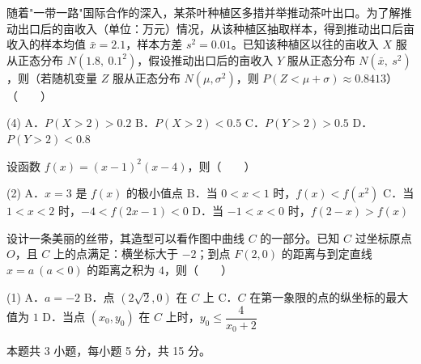 \begin{question}
随着"一带一路"国际合作的深入，某茶叶种植区多措并举推动茶叶出口。为了解推动出口后的亩收入（单位：万元）情况，从该种植区抽取样本，得到推动出口后亩收入的样本均值 $\bar x=2.1$，样本方差 $s^{2}=0.01$。已知该种植区以往的亩收入 $X$ 服从正态分布 $N\left(1.8,\ 0.1^{2}\right)$，假设推动出口后的亩收入 $Y$ 服从正态分布 $N\left(\bar x,\ s^{2}\right)$，则（若随机变量 $Z$ 服从正态分布 $N\left(\mu,\sigma^{2}\right)$，则 $P(Z<\mu+\sigma)\approx0.8413$）\mbox{（　　）}

\begin{gkopts}(4)
\task A．$P(X>2)>0.2$
\task B．$P(X>2)<0.5$
\task C．$P(Y>2)>0.5$
\task D．$P(Y>2)<0.8$
\end{gkopts}

\end{question}
\begin{question}
设函数 $f(x)=(x-1)^{2}(x-4)$，则\mbox{（　　）}

\begin{gkopts}(2)
\task A．$x=3$ 是 $f(x)$ 的极小值点
\task B．当 $0<x<1$ 时，$f(x)<f\left(x^{2}\right)$
\task C．当 $1<x<2$ 时，$-4<f(2x-1)<0$
\task D．当 $-1<x<0$ 时，$f(2-x)>f(x)$
\end{gkopts}

\Needspace{0.4\textheight}
\end{question}
\begin{question}
设计一条美丽的丝带，其造型可以看作图中曲线 $C$ 的一部分。已知 $C$ 过坐标原点 $O$，且 $C$ 上的点满足：横坐标大于 $-2$；到点 $F(2,0)$ 的距离与到定直线 $x=a\ (a<0)$ 的距离之积为 $4$，则\mbox{（　　）}
\nopagebreak[4]
\begin{center}\end{center}
\nopagebreak[4]
\begin{gkopts}(1)
\task A．$a=-2$
\task B．点 $\left(2\sqrt2,0\right)$ 在 $C$ 上
\task C．$C$ 在第一象限的点的纵坐标的最大值为 $1$
\task D．当点 $\left(x_0,y_0\right)$ 在 $C$ 上时，$y_0\le\dfrac{4}{x_0+2}$
\end{gkopts}

\par\medskip

\end{question}

\begin{gktip}
本题共 3 小题，每小题 5 分，共 15 分。
\end{gktip}

